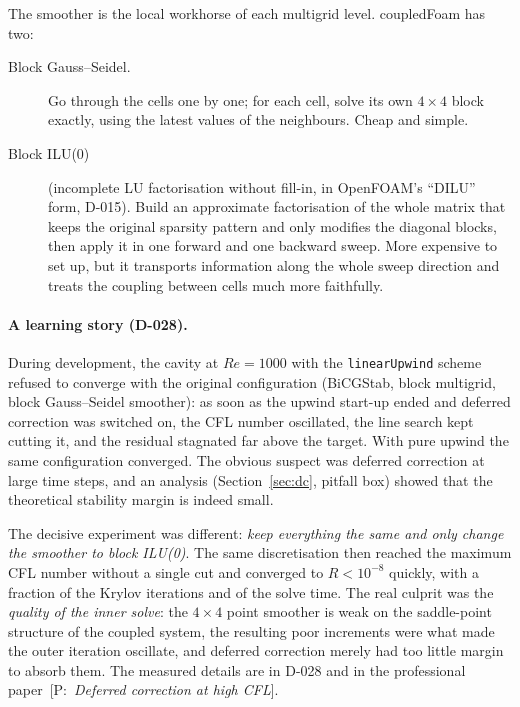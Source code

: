 \documentclass[11pt,a4paper]{article}
\newcommand{\code}[1]{\texttt{#1}}
\newcommand{\pro}[1]{\ {\small[P:~\textit{#1}]}}
\begin{document}
The smoother is the local workhorse of each multigrid level. coupledFoam
has two:
\begin{description}
\item[Block Gauss--Seidel.] Go through the cells one by one; for each cell,
  solve its own $4\times4$ block exactly, using the latest values of the
  neighbours. Cheap and simple.
\item[Block ILU(0)] (incomplete LU factorisation without fill-in, in
  OpenFOAM's ``DILU'' form, D-015). Build an approximate factorisation of
  the whole matrix that keeps the original sparsity pattern and only
  modifies the diagonal blocks, then apply it in one forward and one
  backward sweep. More expensive to set up, but it transports information
  along the whole sweep direction and treats the coupling between cells
  much more faithfully.
\end{description}

\paragraph{A learning story (D-028).} During development, the cavity at
$Re=1000$ with the \code{linearUpwind} scheme refused to converge with
the original configuration (BiCGStab, block multigrid, block Gauss--Seidel
smoother): as soon as the upwind start-up ended and deferred correction
was switched on, the CFL number oscillated, the line search kept cutting
it, and the residual stagnated far above the target. With pure upwind the
same configuration converged. The obvious suspect was deferred correction
at large time steps, and an analysis (Section~\ref{sec:dc}, pitfall box)
showed that the theoretical stability margin is indeed small.

The decisive experiment was different: \emph{keep everything the same and
only change the smoother to block ILU(0)}. The same discretisation then
reached the maximum CFL number without a single cut and converged to
$R<10^{-8}$ quickly, with a fraction of the Krylov iterations and of the
solve time. The real culprit was the \emph{quality of the inner solve}:
the $4\times4$ point smoother is weak on the saddle-point structure of the
coupled system, the resulting poor increments were what made the outer
iteration oscillate, and deferred correction merely had too little margin
to absorb them. The measured details are in D-028 and in the professional
paper\pro{Deferred correction at high CFL}.
\end{document}
